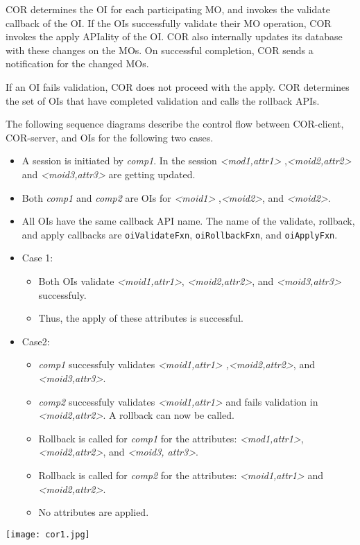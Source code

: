 \begin{flushleft}
\par
COR determines the OI for each participating MO, and invokes the validate callback of the OI. If the OIs successfully validate
their MO operation, COR invokes the apply APIality of the OI. COR also internally updates its database with these changes on the MOs. On successful
completion, COR sends a notification for the changed MOs.
\par
If an OI fails validation, COR does not proceed with the apply. COR determines the set of OIs that have completed validation and calls 
the rollback APIs.
\par
The following sequence diagrams describe the control flow between COR-client, COR-server, and OIs for the following two cases. 
\begin{itemize}
\item
A session is initiated by \textit{comp1}. In the session \textit{<mod1,attr1>} ,\textit{<moid2,attr2>} and \textit{<moid3,attr3>} are getting updated.
\item
Both \textit{comp1} and \textit{comp2} are OIs for \textit{<moid1>} ,\textit{<moid2>}, and \textit{<moid2>}.
\item
All OIs have the same callback API name. The name of the validate, rollback, and apply callbacks are {\tt{oiValidateFxn}}, {\tt{oiRollbackFxn}}, and 
{\tt{oiApplyFxn}}. 
\item
Case 1:
\begin{itemize}
\item
Both OIs validate \textit{<moid1,attr1>}, \textit{<moid2,attr2>}, and \textit{<moid3,attr3>} successfuly.
\item
Thus, the apply of these attributes is successful.
\end{itemize}

\item
Case2:
\begin{itemize}
\item
\textit{comp1} successfuly validates \textit{<moid1,attr1> ,<moid2,attr2>}, and \textit{<moid3,attr3>}.
\item
\textit{comp2} successfuly validates \textit{<moid1,attr1>} and fails validation in \textit{<moid2,attr2>}. A rollback can now be called.
\item
Rollback is called for \textit{comp1} for the attributes: \textit{<mod1,attr1>}, \textit{<moid2,attr2>}, and \textit{<moid3, attr3>}.
\item
Rollback is called for \textit{comp2} for the attributes: \textit{<moid1,attr1>} and \textit{<moid2,attr2>}.
\item
No attributes are applied.
\end{itemize}
\end{itemize}
\end{flushleft}
\newpage
\begin{center}
\texttt{[image: cor1.jpg]}
\end{center}

